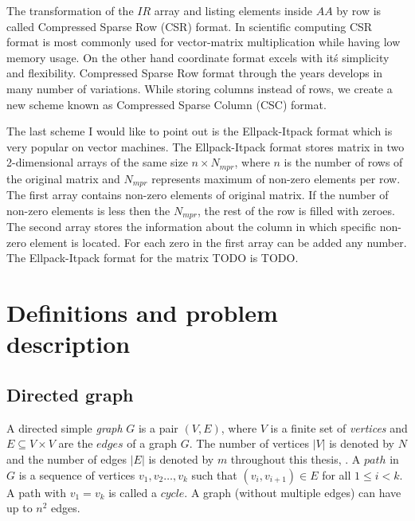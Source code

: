 \documentclass[thesis=M,english]{FITthesis}[2012/10/20]
\begin{document}
The transformation of the $IR$ array and listing elements inside $AA$ by row is called Compressed Sparse Row (CSR) format. In scientific computing CSR format is most commonly used for vector-matrix multiplication while having low memory usage. On the other hand coordinate format excels with it\'s simplicity and flexibility.
Compressed Sparse Row format through the years develops in many number of variations. 
While storing columns instead of rows, we create a new scheme known as Compressed Sparse Column (CSC) format.

The last scheme I would like to point out is the Ellpack-Itpack format which is very popular on vector machines. The Ellpack-Itpack format stores matrix in two 2-dimensional arrays of the same size $n \times N_{mpr}$, where $n$ is the number of rows of the original matrix and $N_{mpr}$ represents maximum of non-zero elements per row. The first array contains non-zero elements of original matrix. If the number of non-zero elements is less then the $N_{mpr}$, the rest of the row is filled with zeroes. The second array stores the information about the column in which specific non-zero element is located. For each zero in the first array can be added any number.
The Ellpack-Itpack format for the matrix TODO is TODO.

\section{Definitions and problem description}

\subsection{Directed graph}
A directed simple \textit{graph} $G$ is a pair $(V, E)$, where $V$ is a finite set of \textit{vertices} and $E \subseteq V \times V$ are the $edges$ of a graph $G$. The number of vertices $|V|$ is denoted by $N$ and the number of edges $|E|$ is denoted by $m$ throughout this thesis, . A $path$ in $G$ is a sequence of vertices $v_1, v_2 \dots ,v_k$ such that $(v_i,v_{i+1}) \in E$ for all $1 \leq i < k$. A path with $v_1 = v_k$ is called a $cycle$. A graph (without multiple edges) can have up to $n^2$ edges. 

\end{document}
